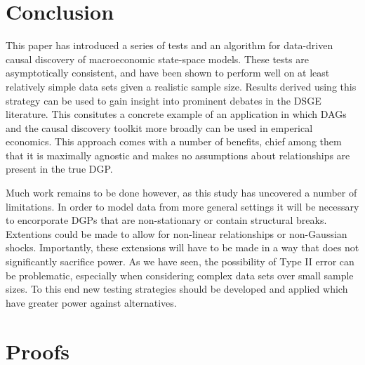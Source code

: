 \documentclass{article}
\begin{document}
\section{Conclusion} \label{conclusion}

This paper has introduced a series of tests and an algorithm for data-driven causal discovery of macroeconomic state-space models. These tests are asymptotically consistent, and have been shown to perform well on at least relatively simple data sets given a realistic sample size. Results derived using this strategy can be used to gain insight into prominent debates in the DSGE literature. This consitutes a concrete example of an application in which DAGs and the causal discovery toolkit more broadly can be used in emperical economics. This approach comes with a number of benefits, chief among them that it is maximally agnostic and makes no assumptions about relationships are present in the true DGP. 

Much work remains to be done however, as this study has uncovered a number of limitations. In order to model data from more general settings it will be necessary to encorporate DGPs that are non-stationary or contain structural breaks. Extentions could be made to allow for non-linear relationships or non-Gaussian shocks. Importantly, these extensions will have to be made in a way that does not significantly sacrifice power. As we have seen, the possibility of Type II error can be problematic, especially when considering complex data sets over small sample sizes. To this end new testing strategies should be developed and applied which have greater power against alternatives. 

\newpage
\printbibliography

\newpage
\appendix
\section{Proofs} \label{proofs}
\end{document}
